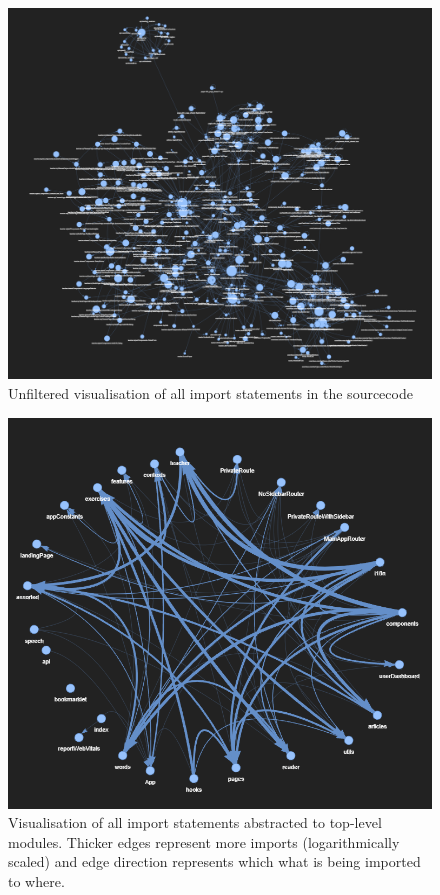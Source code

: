 \documentclass{article}
\begin{document}
\begin{figure}[h]
\includegraphics[width=\textwidth]{graphics/raw_imports.png}
\caption{Unfiltered visualisation of all import statements in the sourcecode}
\label{fig:d:raw}
\end{figure}

\begin{figure}[h]
\includegraphics[width=\textwidth]{graphics/module_abstraction_dirty.png}
\caption{Visualisation of all import statements abstracted to top-level modules. 
Thicker edges represent more imports (logarithmically scaled) and edge 
direction represents which what is being imported to where.}
\label{fig:d:abs}
\end{figure}
\end{document}
